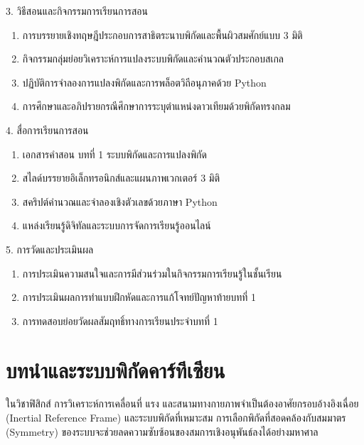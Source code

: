 \newpage

\begin{planbox}[colframe=rbruNavy!85!black, colbacktitle=rbruNavy!85!black]{3. วิธีสอนและกิจกรรมการเรียนการสอน}
\begin{enumerate}[topsep=2pt, itemsep=1pt, partopsep=0pt, parsep=0pt, leftmargin=1.5em]
    \item การบรรยายเชิงทฤษฎีประกอบการสาธิตระนาบพิกัดและพื้นผิวสมศักย์แบบ 3 มิติ
    \item กิจกรรมกลุ่มย่อยวิเคราะห์การแปลงระบบพิกัดและคำนวณตัวประกอบสเกล
    \item ปฏิบัติการจำลองการแปลงพิกัดและการพล็อตวิถีอนุภาคด้วย Python
    \item การศึกษาและอภิปรายกรณีศึกษาการระบุตำแหน่งดาวเทียมด้วยพิกัดทรงกลม
\end{enumerate}
\end{planbox}

\begin{planbox}[colframe=rbruGold!90!black, colbacktitle=rbruGold!90!black]{4. สื่อการเรียนการสอน}
\begin{enumerate}[topsep=2pt, itemsep=1pt, partopsep=0pt, parsep=0pt, leftmargin=1.5em]
    \item เอกสารคำสอน บทที่ 1 ระบบพิกัดและการแปลงพิกัด
    \item สไลด์บรรยายอิเล็กทรอนิกส์และแผนภาพเวกเตอร์ 3 มิติ
    \item สคริปต์คำนวณและจำลองเชิงตัวเลขด้วยภาษา Python
    \item แหล่งเรียนรู้ดิจิทัลและระบบการจัดการเรียนรู้ออนไลน์
\end{enumerate}
\end{planbox}

\begin{planbox}[colframe=rbruSlate, colbacktitle=rbruSlate]{5. การวัดและประเมินผล}
\begin{enumerate}[topsep=2pt, itemsep=1pt, partopsep=0pt, parsep=0pt, leftmargin=1.5em]
    \item การประเมินความสนใจและการมีส่วนร่วมในกิจกรรมการเรียนรู้ในชั้นเรียน
    \item การประเมินผลการทำแบบฝึกหัดและการแก้โจทย์ปัญหาท้ายบทที่ 1
    \item การทดสอบย่อยวัดผลสัมฤทธิ์ทางการเรียนประจำบทที่ 1
\end{enumerate}
\end{planbox}
\clearpage

\section{บทนำและระบบพิกัดคาร์ทีเซียน}
ในวิชาฟิสิกส์ การวิเคราะห์การเคลื่อนที่ แรง และสนามทางกายภาพจำเป็นต้องอาศัยกรอบอ้างอิงเฉื่อย (Inertial Reference Frame) และระบบพิกัดที่เหมาะสม การเลือกพิกัดที่สอดคล้องกับสมมาตร (Symmetry) ของระบบจะช่วยลดความซับซ้อนของสมการเชิงอนุพันธ์ลงได้อย่างมหาศาล

